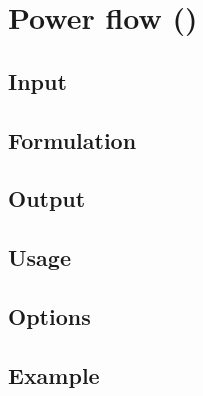 \chapter{Power flow (\pflow)}\label{chap:pflow}
\todo
\section{Input}
\section{Formulation}
\section{Output}
\section{Usage}
\section{Options}
\section{Example}